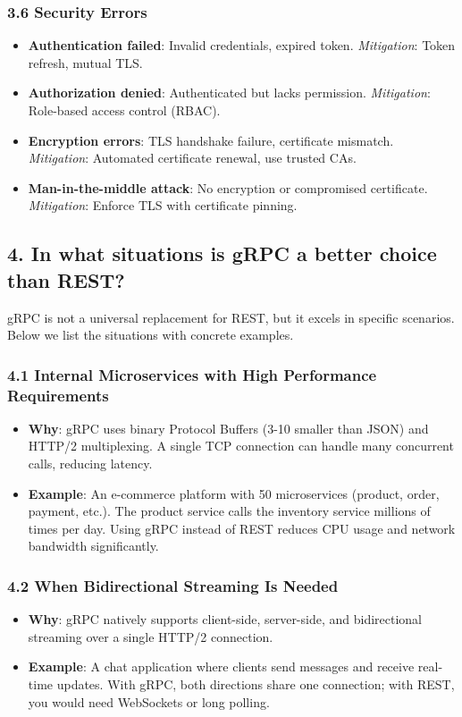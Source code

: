 \documentclass[a4paper]{article}
\begin{document}
\subsubsection{3.6 Security Errors}
\begin{itemize}
    \item \textbf{Authentication failed}: Invalid credentials, expired token. \textit{Mitigation}: Token refresh, mutual TLS.
    \item \textbf{Authorization denied}: Authenticated but lacks permission. \textit{Mitigation}: Role-based access control (RBAC).
    \item \textbf{Encryption errors}: TLS handshake failure, certificate mismatch. \textit{Mitigation}: Automated certificate renewal, use trusted CAs.
    \item \textbf{Man-in-the-middle attack}: No encryption or compromised certificate. \textit{Mitigation}: Enforce TLS with certificate pinning.
\end{itemize}

\subsection{4. In what situations is gRPC a better choice than REST?}

gRPC is not a universal replacement for REST, but it excels in specific scenarios. Below we list the situations with concrete examples.

\subsubsection{4.1 Internal Microservices with High Performance Requirements}
\begin{itemize}
    \item \textbf{Why}: gRPC uses binary Protocol Buffers (3-10 smaller than JSON) and HTTP/2 multiplexing. A single TCP connection can handle many concurrent calls, reducing latency.
    \item \textbf{Example}: An e-commerce platform with 50 microservices (product, order, payment, etc.). The product service calls the inventory service millions of times per day. Using gRPC instead of REST reduces CPU usage and network bandwidth significantly.
\end{itemize}

\subsubsection{4.2 When Bidirectional Streaming Is Needed}
\begin{itemize}
    \item \textbf{Why}: gRPC natively supports client-side, server-side, and bidirectional streaming over a single HTTP/2 connection.
    \item \textbf{Example}: A chat application where clients send messages and receive real-time updates. With gRPC, both directions share one connection; with REST, you would need WebSockets or long polling.
\end{itemize}
\end{document}
